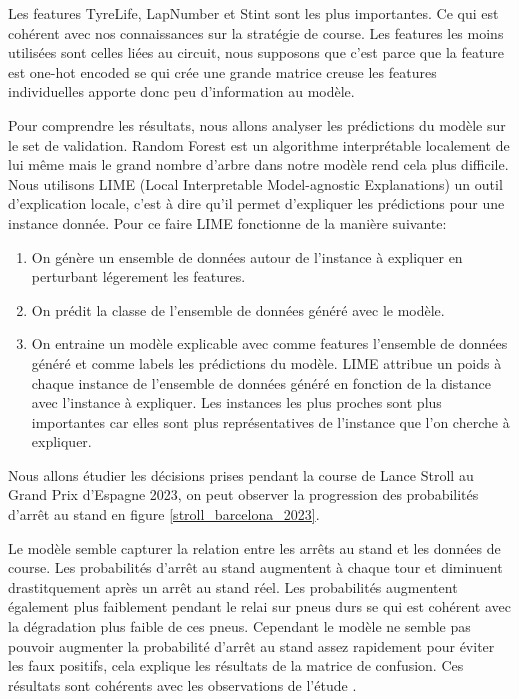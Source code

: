 Les features TyreLife, LapNumber et Stint sont les plus importantes. Ce qui est cohérent avec nos connaissances sur la stratégie de course.
Les features les moins utilisées sont celles liées au circuit, nous supposons que c'est parce que la feature est one-hot encoded se qui crée une grande matrice creuse
les features individuelles apporte donc peu d'information au modèle.

Pour comprendre les résultats, nous allons analyser les prédictions du modèle sur le set de validation.
Random Forest est un algorithme interprétable localement de lui même mais le grand nombre d'arbre dans notre modèle rend cela plus difficile.
Nous utilisons LIME (Local Interpretable Model-agnostic Explanations) \cite{lime} un outil d'explication locale,
c'est à dire qu'il permet d'expliquer les prédictions pour une instance donnée.
Pour ce faire LIME fonctionne de la manière suivante:
\begin{enumerate}
    \item On génère un ensemble de données autour de l'instance à expliquer en perturbant légerement les features.
    \item On prédit la classe de l'ensemble de données généré avec le modèle.
    \item On entraine un modèle explicable avec comme features l'ensemble de données généré et comme labels les prédictions du modèle. LIME attribue un poids à chaque instance de l'ensemble de données généré en fonction de la distance avec l'instance à expliquer. Les instances les plus proches sont plus importantes car elles sont plus représentatives de l'instance que l'on cherche à expliquer.
\end{enumerate}

Nous allons étudier les décisions prises pendant la course de Lance Stroll au Grand Prix d'Espagne 2023,
on peut observer la progression  des probabilités d'arrêt au stand en figure \ref{stroll_barcelona_2023}.

Le modèle semble capturer la relation entre les arrêts au stand et les données de course.
Les probabilités d'arrêt au stand augmentent à chaque tour et diminuent drastitquement après un arrêt au stand réel.
Les probabilités augmentent également plus faiblement pendant le relai sur pneus durs se qui est cohérent avec la dégradation plus faible de ces pneus.
Cependant le modèle ne semble pas pouvoir augmenter la probabilité d'arrêt au stand assez rapidement pour éviter les faux positifs, cela explique les résultats de la matrice de confusion.
Ces résultats sont cohérents avec les observations de l'étude \cite{app10217805}.

